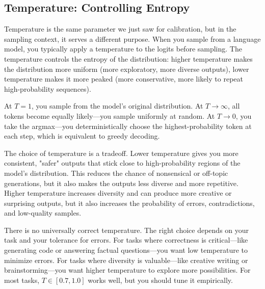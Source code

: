 \vspace{1em}

\subsection{Temperature: Controlling Entropy}

Temperature is the same parameter we just saw for calibration, but in the sampling context, it serves a different purpose. When you sample from a language model, you typically apply a temperature to the logits before sampling. The temperature controls the entropy of the distribution: higher temperature makes the distribution more uniform (more exploratory, more diverse outputs), lower temperature makes it more peaked (more conservative, more likely to repeat high-probability sequences).

\vspace{0.3cm}

At $T = 1$, you sample from the model's original distribution. At $T \to \infty$, all tokens become equally likely---you sample uniformly at random. At $T \to 0$, you take the argmax---you deterministically choose the highest-probability token at each step, which is equivalent to greedy decoding.

\vspace{0.3cm}

The choice of temperature is a tradeoff. Lower temperature gives you more consistent, "safer" outputs that stick close to high-probability regions of the model's distribution. This reduces the chance of nonsensical or off-topic generations, but it also makes the outputs less diverse and more repetitive. Higher temperature increases diversity and can produce more creative or surprising outputs, but it also increases the probability of errors, contradictions, and low-quality samples.

\vspace{0.3cm}

There is no universally correct temperature. The right choice depends on your task and your tolerance for errors. For tasks where correctness is critical---like generating code or answering factual questions---you want low temperature to minimize errors. For tasks where diversity is valuable---like creative writing or brainstorming---you want higher temperature to explore more possibilities. For most tasks, $T \in [0.7, 1.0]$ works well, but you should tune it empirically.

\vspace{1em}

